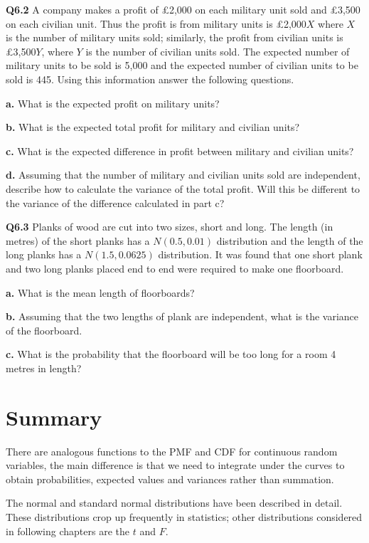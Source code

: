 \documentclass[
  oneside]{krantz}
\begin{document}
\textbf{Q6.2} A company makes a profit of \pounds 2,000 on each military unit sold and \pounds 3,500 on each civilian unit. Thus the profit is from military units is \pounds 2,000\(X\) where \(X\) is the number of military units sold; similarly, the profit from civilian units is \pounds 3,500\(Y\), where \(Y\) is the number of civilian units sold. The expected number of military units to be sold is 5,000 and the expected number of civilian units to be sold is 445. Using this information answer the following questions.

\textbf{a.} What is the expected profit on military units?

\textbf{b.} What is the expected total profit for military and civilian units?

\textbf{c.} What is the expected difference in profit between military and civilian units?

\textbf{d.} Assuming that the number of military and civilian units sold are independent, describe how to calculate the variance of the total profit. Will this be different to the variance of the difference calculated in part c?

\textbf{Q6.3} Planks of wood are cut into two sizes, short and long. The length (in metres) of the short planks has a \(N(0.5, 0.01)\) distribution and the length of the long planks has a \(N(1.5, 0.0625)\) distribution. It was found that one short plank and two long planks placed end to end were required to make one floorboard.

\textbf{a.} What is the mean length of floorboards?

\textbf{b.} Assuming that the two lengths of plank are independent, what is the variance of the floorboard.

\textbf{c.} What is the probability that the floorboard will be too long for a room 4 metres in length?

\hypertarget{SUMcontrv}{%
\section{Summary}\label{SUMcontrv}}

There are analogous functions to the PMF and CDF for continuous random variables, the main difference is that we need to integrate under the curves to obtain probabilities, expected values and variances rather than summation.

The normal and standard normal distributions have been described in detail. These distributions crop up frequently in statistics; other distributions considered in following chapters are the \(t\) and \(F\).
\end{document}
